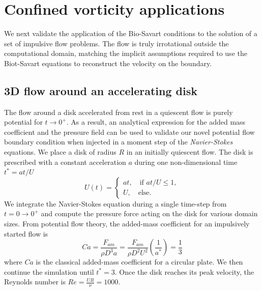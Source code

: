 \documentclass{article}
\begin{document}
\section{Confined vorticity applications}

We next validate the application of the Bio-Savart conditions to the solution of a set of impulsive flow problems. The flow is truly irrotational outside the computational domain, matching the implicit assumptions required to use the Biot-Savart equations to reconstruct the velocity on the boundary. 

\subsection{3D flow around an accelerating disk}

The flow around a disk accelerated from rest in a quiescent flow is purely potential for $t\to 0^+$. As a result, an analytical expression for the added mass coefficient and the pressure field can be used to validate our novel potential flow boundary condition when injected in a moment step of the \emph{Navier-Stokes} equations. We place a disk of radius $R$ in an initially quiescent flow. The disk is prescribed with a constant acceleration $a$ during one non-dimensional time $t^*=at/U$
\begin{equation}
    U(t) = \begin{cases}
        at, \quad \text{if } at/U\le1,\\
        U, \quad \text{else}.
    \end{cases}
\end{equation}
We integrate the Navier-Stokes equation during a single time-step from $t=0\to0^+$ and compute the pressure force acting on the disk for various domain sizes. From potential flow theory, the added-mass coefficient for an impulsively started flow is
\begin{equation}
    Ca  = \frac{F_{am}}{\rho D^3 a} = \frac{F_{am}}{\rho D^2U^2}\left(\frac{1}{a^*}\right) = \frac{1}{3}
\end{equation}
where $Ca$ is the classical added-mass coefficient for a circular plate. We then continue the simulation until $t^*=3$. Once the disk reaches its peak velocity, the Reynolds number is $Re=\frac{UR}{\nu}=1000$. 
\end{document}
